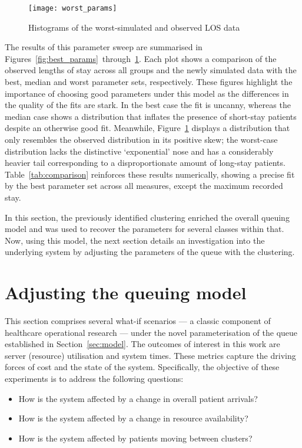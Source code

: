 \documentclass[]{interact}
\newlength{\imgwidth}
\theoremstyle{plain}%
\theoremstyle{definition}
\theoremstyle{remark}
\begin{document}
\begin{figure}
    \centering
    \texttt{[image: worst\_params]}
    \caption{%
        Histograms of the worst-simulated and observed LOS data
    }\label{fig:worst_params}
\end{figure}

The results of this parameter sweep are summarised in
Figures~\ref{fig:best_params}~through~\ref{fig:worst_params}. Each plot shows a
comparison of the observed lengths of stay across all groups and the newly
simulated data with the best, median and worst parameter sets, respectively.
These figures highlight the importance of choosing good parameters under this
model as the differences in the quality of the fits are stark. In the best case
the fit is uncanny, whereas the median case shows a distribution that inflates
the presence of short-stay patients despite an otherwise good fit. Meanwhile,
Figure~\ref{fig:worst_params} displays a distribution that only resembles the
observed distribution in its positive skew; the worst-case distribution lacks
the distinctive `exponential' nose and has a considerably heavier tail
corresponding to a disproportionate amount of long-stay patients.
Table~\ref{tab:comparison} reinforces these results numerically, showing a
precise fit by the best parameter set across all measures, except the maximum
recorded stay.

\begin{table}
    \centering
    \resizebox{\textwidth}{!}{}
    \caption{%
        A comparison of the observed and simulated data based on the model
        parameters and summary statistics for length of stay
    }\label{tab:comparison}
\end{table}

In this section, the previously identified clustering enriched the overall
queuing model and was used to recover the parameters for several classes within
that. Now, using this model, the next section details an investigation into the
underlying system by adjusting the parameters of the queue with the clustering.

\section{Adjusting the queuing model}\label{sec:scenarios}

This section comprises several what-if scenarios --- a classic component of
healthcare operational research --- under the novel parameterisation of the
queue established in Section~\ref{sec:model}. The outcomes of interest in this
work are server (resource) utilisation and system times. These metrics capture
the driving forces of cost and the state of the system. Specifically, the
objective of these experiments is to address the following questions:
\begin{itemize}
    \item How is the system affected by a change in overall patient arrivals?
    \item How is the system affected by a change in resource availability?
    \item How is the system affected by patients moving between clusters?
\end{itemize}
\end{document}
